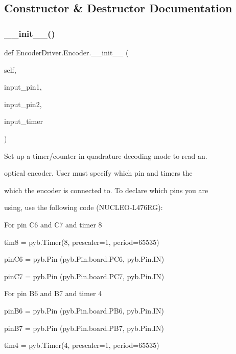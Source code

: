 \subsection{Constructor \& Destructor Documentation}
\mbox{\label{classEncoderDriver_1_1Encoder_a5699cf699993f343adc3ad1c9b507157}} 
\subsubsection{\texorpdfstring{\+\_\+\+\_\+init\+\_\+\+\_\+()}{\_\_init\_\_()}}
{\footnotesize\ttfamily def Encoder\+Driver.\+Encoder.\+\_\+\+\_\+init\+\_\+\+\_\+ (\begin{DoxyParamCaption}\item[{}]{self,  }\item[{}]{input\+\_\+pin1,  }\item[{}]{input\+\_\+pin2,  }\item[{}]{input\+\_\+timer }\end{DoxyParamCaption})}



Set up a timer/counter in quadrature decoding mode to read an. 

optical encoder. User must specify which pin and timers the

which the encoder is connected to. To declare which pins you are

using, use the following code (N\+U\+C\+L\+E\+O-\/\+L476\+RG)\+:

For pin C6 and C7 and timer 8 \begin{DoxyVerb}tim8 = pyb.Timer(8, prescaler=1, period=65535)

pinC6 = pyb.Pin (pyb.Pin.board.PC6, pyb.Pin.IN)

pinC7 = pyb.Pin (pyb.Pin.board.PC7, pyb.Pin.IN)
\end{DoxyVerb}


For pin B6 and B7 and timer 4 \begin{DoxyVerb}pinB6 = pyb.Pin (pyb.Pin.board.PB6, pyb.Pin.IN)

pinB7 = pyb.Pin (pyb.Pin.board.PB7, pyb.Pin.IN)

tim4 = pyb.Timer(4, prescaler=1, period=65535)
\end{DoxyVerb}



